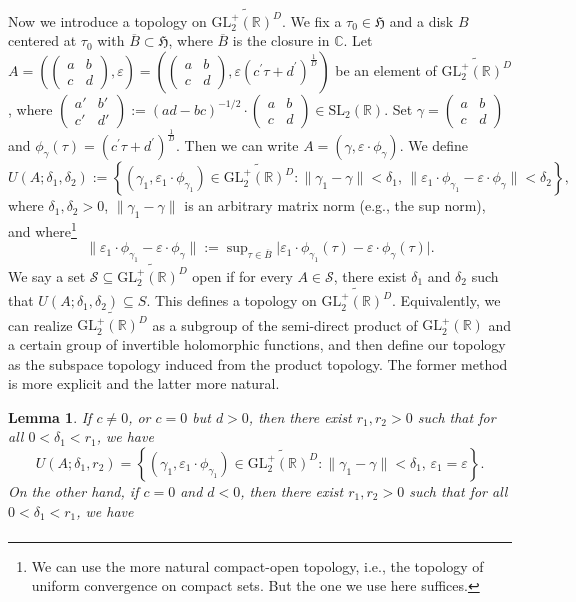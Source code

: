 \documentclass[12pt]{amsart}
\numberwithin{equation}{section}
\theoremstyle{plain}
\newtheorem{lemm}[thm]{Lemma}
\theoremstyle{definition}
\theoremstyle{remark}
\newcommand\tbtmat[4]{\left(\begin{smallmatrix}{#1} & {#2} \\ {#3} & {#4}\end{smallmatrix}\right)}
\newcommand\numC{\mathbb{C}}
\newcommand\slR{\mathrm{SL}_2(\mathbb{R})}
\newcommand\glpR{\mathrm{GL}_2^{+}(\mathbb{R})}
\newcommand\uhp{\mathfrak{H}}
\newcommand\eleglptRaDp[6]{\left(\left(\begin{smallmatrix}{#1} & {#2} \\ {#3} & {#4}\end{smallmatrix}\right),{#5}\left({#3}^\prime \tau+{#4}^\prime \right)^{\frac{1}{#6}}\right)}
\newcommand\Dcover[2]{\widetilde{#1^{#2}}}
\begin{document}
\begin{appendix}
Now we introduce a topology on $\Dcover{\glpR}{D}$. We fix a $\tau_0\in\uhp$ and a disk $B$ centered at $\tau_0$ with $\overline{B}\subset\uhp$, where $\overline{B}$ is the closure in $\numC$. Let $A=\left(\tbtmat{a}{b}{c}{d}, \varepsilon\right)=\eleglptRaDp{a}{b}{c}{d}{\varepsilon}{D}$ be an element of $\Dcover{\glpR}{D}$, where $\tbtmat{a'}{b'}{c'}{d'}:=(ad-bc)^{-1/2}\cdot\tbtmat{a}{b}{c}{d}\in\slR$. Set $\gamma=\tbtmat{a}{b}{c}{d}$ and $\phi_\gamma(\tau)=(c^\prime\tau+d^\prime)^{\frac{1}{D}}$. Then we can write $A=(\gamma,\varepsilon\cdot\phi_\gamma)$. We define
\begin{equation}
\label{eq:defUA}
U(A;\delta_1,\delta_2):=\left\{(\gamma_1,\varepsilon_1\cdot\phi_{\gamma_1})\in\Dcover{\glpR}{D}\colon\lVert\gamma_1-\gamma\rVert<\delta_1,\,\lVert\varepsilon_1\cdot\phi_{\gamma_1}-\varepsilon\cdot\phi_{\gamma}\rVert<\delta_2\right\},
\end{equation}
where $\delta_1,\delta_2>0$, $\lVert\gamma_1-\gamma\rVert$ is an arbitrary matrix norm (e.g., the sup norm), and where\footnote{We can use the more natural compact-open topology, i.e., the topology of uniform convergence on compact sets. But the one we use here suffices.}
$$\lVert\varepsilon_1\cdot\phi_{\gamma_1}-\varepsilon\cdot\phi_{\gamma}\rVert:=\sup\nolimits_{\tau\in\overline{B}}\lvert\varepsilon_1\cdot\phi_{\gamma_1}(\tau)-\varepsilon\cdot\phi_{\gamma}(\tau)\rvert.$$
We say a set $\mathcal{S}\subseteq\Dcover{\glpR}{D}$ open if for every $A\in \mathcal{S}$, there exist $\delta_1$ and $\delta_2$ such that $U(A;\delta_1,\delta_2)\subseteq S$. This defines a topology on $\Dcover{\glpR}{D}$. Equivalently, we can realize $\Dcover{\glpR}{D}$ as a subgroup of the semi-direct product of $\glpR$ and a certain group of invertible holomorphic functions, and then define our topology as the subspace topology induced from the product topology. The former method is more explicit and the latter more natural.
\begin{lemm}
\label{lemm:neighborhood}
If $c\neq0$, or $c=0$ but $d>0$, then there exist $r_1,r_2>0$ such that for all $0<\delta_1<r_1$, we have
\begin{equation}
\label{eq:smallneighborhood1}
U(A;\delta_1,r_2)=\left\{(\gamma_1,\varepsilon_1\cdot\phi_{\gamma_1})\in\Dcover{\glpR}{D}\colon\lVert\gamma_1-\gamma\rVert<\delta_1,\,\varepsilon_1=\varepsilon\right\}.
\end{equation}
On the other hand, if $c=0$ and $d<0$, then there exist $r_1,r_2>0$ such that for all $0<\delta_1<r_1$, we have
\begin{multline}

\end{multline}
\end{lemm}
\end{appendix}
\end{document}

